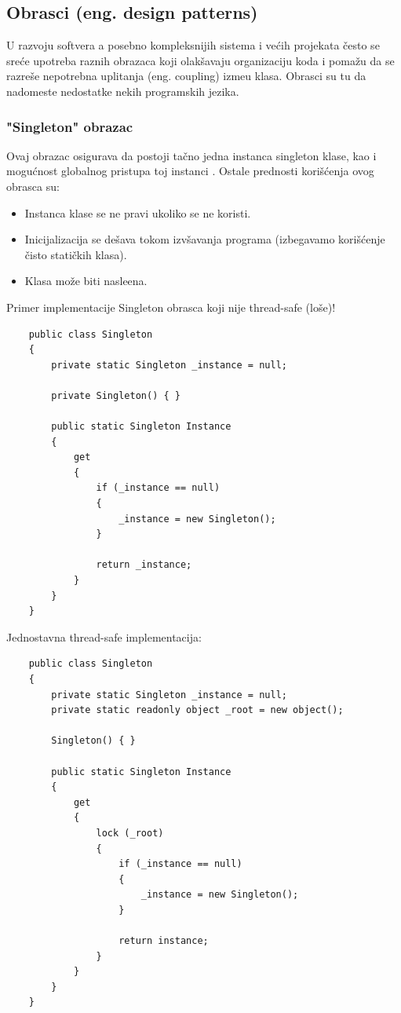 \subsection{Obrasci (eng. design patterns)}
U razvoju softvera a posebno kompleksnijih sistema i ve\'cih projekata \v{c}esto se sre\'ce upotreba raznih
obrazaca koji olak\v{s}avaju organizaciju koda i poma\v{z}u da se razre\v{s}e nepotrebna uplitanja (eng. coupling)
izme\dj u klasa. Obrasci su tu da nadomeste nedostatke nekih programskih jezika.

\subsubsection{"Singleton" obrazac}
Ovaj obrazac osigurava da postoji ta\v{c}no jedna instanca singleton klase, kao i mogu\'cnost globalnog pristupa toj instanci \cite{gameprog}.
Ostale prednosti kori\v{s}\'cenja ovog obrasca su:

\begin{itemize}
    \item Instanca klase se ne pravi ukoliko se ne koristi.
    \item Inicijalizacija se de\v{s}ava tokom izv\v{s}avanja programa (izbegavamo kori\v{s}\'cenje \v{c}isto stati\v{c}kih klasa).
    \item Klasa mo\v{z}e biti nasle\dj ena. 
\end{itemize}

Primer implementacije Singleton obrasca koji nije thread-safe (lo\v{s}e)!
\begin{verbatim}
    public class Singleton
    {
        private static Singleton _instance = null;

        private Singleton() { }

        public static Singleton Instance
        {
            get
            {
                if (_instance == null)
                {
                    _instance = new Singleton();
                }
                
                return _instance;
            }
        }
    }
\end{verbatim}

Jednostavna thread-safe implementacija:
\begin{verbatim}
    public class Singleton
    {
        private static Singleton _instance = null;
        private static readonly object _root = new object();

        Singleton() { }

        public static Singleton Instance
        {
            get
            {
                lock (_root)
                {
                    if (_instance == null)
                    {
                        _instance = new Singleton();
                    }

                    return instance;
                }
            }
        }
    }
\end{verbatim}

